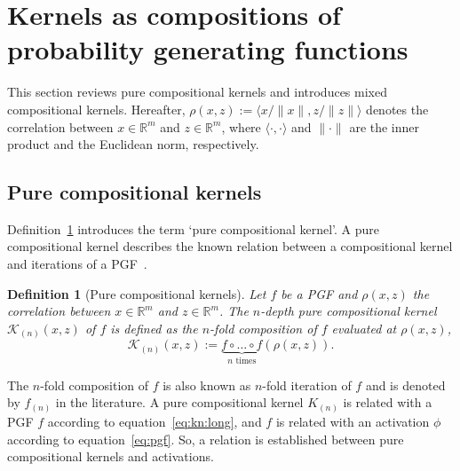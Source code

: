 \documentclass[final, 12pt]{colt2021} %
\newtheorem{dfn}{Definition}
\begin{document}
\section{Kernels as compositions of probability generating functions}
\label{sec:kernels_and_pgfs}

This section reviews pure compositional kernels and introduces
mixed compositional kernels.
Hereafter, $\rho (x, z) := \langle x / \|x\|, z / \|z\| \rangle$
denotes the correlation between $x\in\mathbb{R}^m$ and $z\in\mathbb{R}^m$,
where $\langle \cdot, \cdot \rangle$ and $\|\cdot\|$
are the inner product and the Euclidean norm, respectively.

\subsection{Pure compositional kernels}

Definition~\ref{dfn:pure_comp_k} introduces the term
`pure compositional kernel'.
A pure compositional kernel describes
the known relation between
a compositional kernel and
iterations of a PGF~\citep{daniely2016, liang2021}.

\begin{dfn}[Pure compositional kernels]
\label{dfn:pure_comp_k}
Let $f$ be a PGF and
$\rho (x, z)$ the correlation between $x\in\mathbb{R}^m$ and $z\in\mathbb{R}^m$.
The $n$-depth pure compositional kernel $\mathcal{K}_{(n)}(x,z)$ of $f$
is defined as the $n$-fold composition of $f$
evaluated at $\rho (x, z)$,
\begin{equation}
\label{eq:kn:long}
\mathcal{K}_{(n)}(x, z):=
\underbrace{f\circ\dots\circ f}_\text{$n$ times}
(\rho(x, z)).
\end{equation}
\end{dfn}

The $n$-fold composition of $f$ is also known as $n$-fold iteration of $f$
and is denoted by $f_{(n)}$ in the literature.
A pure compositional kernel $K_{(n)}$ is related with a PGF $f$
according to equation~\eqref{eq:kn:long},
and $f$ is related with an activation $\phi$
according to equation~\eqref{eq:pgf}.
So, a relation is established between
pure compositional kernels and activations.
\end{document}
